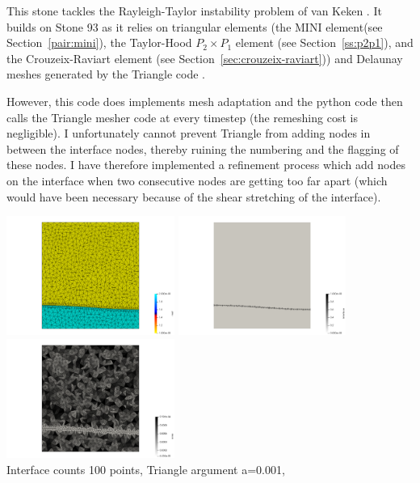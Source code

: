 

This stone tackles the Rayleigh-Taylor instability problem of van Keken \etal \cite{vaks97}. 
It builds on Stone 93 as it relies on triangular elements (the MINI element(see Section~\ref{pair:mini}), 
the Taylor-Hood $P_2\times P_1$ element (see Section~\ref{ss:p2p1}), 
and the Crouzeix-Raviart element (see Section~\ref{sec:crouzeix-raviart})) and Delaunay meshes
generated by the Triangle code \cite{shew14}.  

However, this code does implements mesh adaptation and the python code then calls the Triangle mesher code
at every timestep (the remeshing cost is negligible).
I unfortunately cannot prevent Triangle from adding nodes in between the interface nodes, thereby 
ruining the numbering and the flagging of these nodes. I have therefore implemented a refinement 
process which add nodes on the interface when two consecutive nodes are getting too far apart (which 
would have been necessary because of the shear stretching of the interface). 

\begin{center}
\includegraphics[width=5.5cm]{python_codes/fieldstone_95/init/mat}
\includegraphics[width=5.5cm]{python_codes/fieldstone_95/init/interface}
\includegraphics[width=5.5cm]{python_codes/fieldstone_95/init/area}\\
{\captionfont Interface counts 100 points, Triangle argument a=0.001, } 
\end{center}

